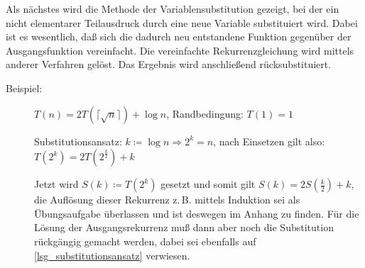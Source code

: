 \documentclass[ngerman,draft,parskip=half*,twoside]{scrreprt}
\theoremstyle{break}
\begin{document}
Als nächstes wird die Methode der Variablensubstitution gezeigt,
bei der ein nicht elementarer Teilausdruck durch eine neue Variable substituiert wird. Dabei ist es wesentlich, daß
sich die dadurch neu entstandene Funktion gegenüber der Ausgangsfunktion vereinfacht. Die vereinfachte Rekurrenzgleichung wird
mittels anderer Verfahren gelöst. Das Ergebnis wird anschließend rücksubstituiert.
	\begin{description}
		\item [Beispiel:] $T(n) = 2 T(\lceil\sqrt{n}\rceil) + \log n$, Randbedingung: $T(1)=1$

		Substitutionsansatz: $k\coloneqq\log n \Rightarrow 2^k=n$, nach Einsetzen gilt also: $T(2^k) = 2 T(2^{\frac{k}{2}})+k$
		
		Jetzt wird $S(k) \coloneqq T(2^k)$ gesetzt und somit gilt $S(k) = 2 S\left(\frac{k}{2}\right)+k$, die Auflösung dieser
		Rekurrenz z.\,B. mittels Induktion sei als Übungsaufgabe überlassen und ist deswegen im Anhang zu finden. 
		Für die Lösung der Ausgangsrekurrenz muß dann aber noch die Substitution rückgängig gemacht werden, dabei sei
		ebenfalls auf \autoref{lsg_substitutionsansatz} verwiesen. 
	\end{description}	
\end{document}
